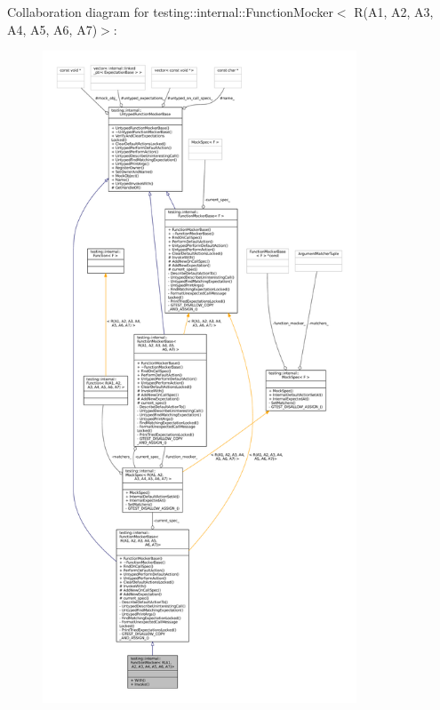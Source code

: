 Collaboration diagram for testing\+:\+:internal\+:\+:Function\+Mocker$<$ R(A1, A2, A3, A4, A5, A6, A7)$>$\+:
\nopagebreak
\begin{figure}[H]
\begin{center}
\leavevmode
\includegraphics[height=550pt]{classtesting_1_1internal_1_1FunctionMocker_3_01R_07A1_00_01A2_00_01A3_00_01A4_00_01A5_00_01A6_00_01A7_08_4__coll__graph}
\end{center}
\end{figure}
